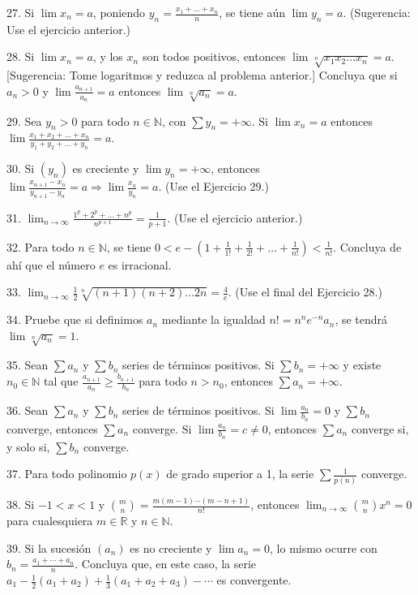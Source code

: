 \documentclass[12pt,oneside]{book}
\begin{document}
27. Si \(\lim x_n = a\), poniendo \(y_n = \frac{x_1 + \dots + x_n}{n}\), se tiene aún \(\lim y_n = a\). (Sugerencia: Use el ejercicio anterior.)

28. Si \(\lim x_n = a\), y los \(x_n\) son todos positivos, entonces \(\lim \sqrt[n]{x_1 x_2 \dots x_n} = a\). [Sugerencia: Tome logaritmos y reduzca al problema anterior.] Concluya que si \(a_n > 0\) y \(\lim \frac{a_{n+1}}{a_n} = a\) entonces \(\lim \sqrt[n]{a_n} = a\).

29. Sea \(y_n > 0\) para todo \(n \in \mathbb{N}\), con \(\sum y_n = +\infty\). Si \(\lim x_n = a\) entonces \(\lim \frac{x_1 + x_2 + \dots + x_n}{y_1 + y_2 + \dots + y_n} = a\).

30. Si \((y_n)\) es creciente y \(\lim y_n = +\infty\), entonces \(\lim \frac{x_{n+1} - x_n}{y_{n+1} - y_n} = a \Rightarrow \lim \frac{x_n}{y_n} = a\). (Use el Ejercicio 29.)

31. \(\lim_{n\to\infty} \frac{1^p + 2^p + \dots + n^p}{n^{p+1}} = \frac{1}{p+1}\). (Use el ejercicio anterior.)

32. Para todo \(n \in \mathbb{N}\), se tiene \(0 < e - \left(1 + \frac{1}{1!} + \frac{1}{2!} + \dots + \frac{1}{n!}\right) < \frac{1}{n!}\). Concluya de ahí que el número \(e\) es irracional.

33. \(\lim_{n\to\infty} \frac{1}{2} \sqrt[n]{(n+1)(n+2)\dots 2n} = \frac{4}{e}\). (Use el final del Ejercicio 28.)

34. Pruebe que si definimos \(a_n\) mediante la igualdad \(n! = n^n e^{-n} a_n\), se tendrá \(\lim \sqrt[n]{a_n} = 1\).

35. Sean \(\sum a_n\) y \(\sum b_n\) series de términos positivos. Si \(\sum b_n = +\infty\) y existe \(n_0 \in \mathbb{N}\) tal que \(\frac{a_{n+1}}{a_n} \geq \frac{b_{n+1}}{b_n}\) para todo \(n > n_0\), entonces \(\sum a_n = +\infty\).

36. Sean \(\sum a_n\) y \(\sum b_n\) series de términos positivos. Si \(\lim \frac{a_n}{b_n} = 0\) y \(\sum b_n\) converge, entonces \(\sum a_n\) converge. Si \(\lim \frac{a_n}{b_n} = c \neq 0\), entonces \(\sum a_n\) converge si, y solo si, \(\sum b_n\) converge.

37. Para todo polinomio \(p(x)\) de grado superior a 1, la serie \(\sum \frac{1}{p(n)}\) converge.

38. Si \(-1 < x < 1\) y \(\binom{m}{n} = \frac{m(m-1)\cdots(m-n+1)}{n!}\), entonces \(\lim_{n \to \infty} \binom{m}{n}x^n = 0\) para cualesquiera \(m \in \mathbb{R}\) y \(n \in \mathbb{N}\).

39. Si la sucesión \((a_n)\) es no creciente y \(\lim a_n = 0\), lo mismo ocurre con \(b_n = \frac{a_1 + \cdots + a_n}{n}\). Concluya que, en este caso, la serie \(a_1 - \frac{1}{2}(a_1 + a_2) + \frac{1}{3}(a_1 + a_2 + a_3) - \cdots\) es convergente.
\end{document}
